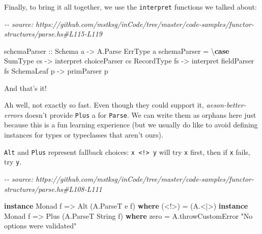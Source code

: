 \documentclass[]{article}
\newenvironment{Shaded}{}{}
\newcommand{\CommentTok}[1]{\textcolor[rgb]{0.38,0.63,0.69}{\textit{#1}}}
\newcommand{\DataTypeTok}[1]{\textcolor[rgb]{0.56,0.13,0.00}{#1}}
\newcommand{\KeywordTok}[1]{\textcolor[rgb]{0.00,0.44,0.13}{\textbf{#1}}}
\newcommand{\NormalTok}[1]{#1}
\newcommand{\OperatorTok}[1]{\textcolor[rgb]{0.40,0.40,0.40}{#1}}
\newcommand{\OtherTok}[1]{\textcolor[rgb]{0.00,0.44,0.13}{#1}}
\newcommand{\StringTok}[1]{\textcolor[rgb]{0.25,0.44,0.63}{#1}}
\begin{document}
Finally, to bring it all together, we use the \texttt{interpret} functions we
talked about:

\begin{Shaded}
\begin{Highlighting}[]
\CommentTok{{-}{-} source: https://github.com/mstksg/inCode/tree/master/code{-}samples/functor{-}structures/parse.hs\#L115{-}L119}

\OtherTok{schemaParser ::} \DataTypeTok{Schema}\NormalTok{ a }\OtherTok{{-}\textgreater{}} \DataTypeTok{A.Parse} \DataTypeTok{ErrType}\NormalTok{ a}
\NormalTok{schemaParser }\OtherTok{=}\NormalTok{ \textbackslash{}}\KeywordTok{case}
    \DataTypeTok{SumType}\NormalTok{    cs }\OtherTok{{-}\textgreater{}}\NormalTok{ interpret choiceParser cs}
    \DataTypeTok{RecordType}\NormalTok{ fs }\OtherTok{{-}\textgreater{}}\NormalTok{ interpret fieldParser fs}
    \DataTypeTok{SchemaLeaf}\NormalTok{ p  }\OtherTok{{-}\textgreater{}}\NormalTok{ primParser p}
\end{Highlighting}
\end{Shaded}

And that's it!

Ah well, not exactly so fast. Even though they could support it,
\emph{aeson-better-errors} doesn't provide \texttt{Plus} a for \texttt{Parse}.
We can write them as orphans here just because this is a fun learning experience
(but we usually do like to avoid defining instances for types or typeclasses
that aren't ours).

\texttt{Alt} and \texttt{Plus} represent fallback choices:
\texttt{x\ \textless{}!\textgreater{}\ y} will try \texttt{x} first, then if
\texttt{x} fails, try \texttt{y}.

\begin{Shaded}
\begin{Highlighting}[]
\CommentTok{{-}{-} source: https://github.com/mstksg/inCode/tree/master/code{-}samples/functor{-}structures/parse.hs\#L108{-}L111}

\KeywordTok{instance} \DataTypeTok{Monad}\NormalTok{ f }\OtherTok{=\textgreater{}} \DataTypeTok{Alt}\NormalTok{ (}\DataTypeTok{A.ParseT}\NormalTok{ e f) }\KeywordTok{where}
\NormalTok{    (}\OperatorTok{\textless{}!\textgreater{}}\NormalTok{) }\OtherTok{=}\NormalTok{ (}\OperatorTok{A.\textless{}|\textgreater{}}\NormalTok{)}
\KeywordTok{instance} \DataTypeTok{Monad}\NormalTok{ f }\OtherTok{=\textgreater{}} \DataTypeTok{Plus}\NormalTok{ (}\DataTypeTok{A.ParseT} \DataTypeTok{String}\NormalTok{ f) }\KeywordTok{where}
\NormalTok{    zero  }\OtherTok{=}\NormalTok{ A.throwCustomError }\StringTok{"No options were validated"}
\end{Highlighting}
\end{Shaded}
\end{document}
